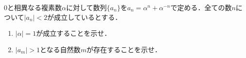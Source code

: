 \documentclass[../../main.tex]{subfiles}
\begin{document}
$0$と相異なる複素数$\alpha$に対して数列$\{a_n\}$を$a_n=\alpha^n+\alpha^{-n}$で定める．全ての数$n$について$|a_n|<2$が成立しているとする．
\begin{enumerate}
  \item $|\alpha|=1$が成立することを示せ．
  \item $|a_m|>1$となる自然数$m$が存在することを示せ．
\end{enumerate}
\end{document}
